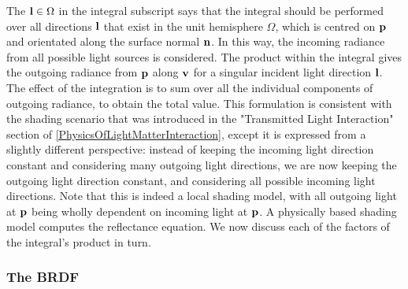 The \begin{math}\mathbf{l}\in\Omega\end{math} in the integral subscript says that the integral should be performed over all directions \begin{math}\mathbf{l}\end{math} that exist in the unit hemisphere \begin{math}\Omega\end{math}, which is centred on \begin{math}\mathbf{p}\end{math} and orientated along the surface normal \begin{math}\mathbf{n}\end{math}. In this way, the incoming radiance from all possible light sources is considered. The product within the integral gives the outgoing radiance from \begin{math}\mathbf{p}\end{math} along \begin{math}\mathbf{v}\end{math} for a singular incident light direction \begin{math}\mathbf{l}\end{math}. The effect of the integration is to sum over all the individual components of outgoing radiance, to obtain the total value. This formulation is consistent with the shading scenario that was introduced in the "Transmitted Light Interaction" section of \ref{PhysicsOfLightMatterInteraction}, except it is expressed from a slightly different perspective: instead of keeping the incoming light direction constant and considering many outgoing light directions, we are now keeping the outgoing light direction constant, and considering all possible incoming light directions. Note that this is indeed a local shading model, with all outgoing light at \begin{math}\mathbf{p}\end{math} being wholly dependent on incoming light at \begin{math}\mathbf{p}\end{math}. A physically based shading model computes the reflectance equation. We now discuss each of the factors of the integral's product in turn.

\subsubsection{The BRDF}

